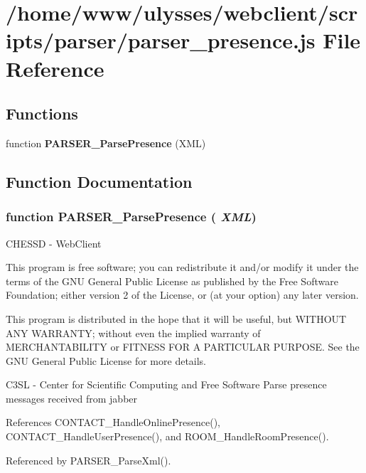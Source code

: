 \section{/home/www/ulysses/webclient/scripts/parser/parser\_\-presence.js File Reference}
\label{parser__presence_8js}
\subsection*{Functions}
\begin{CompactItemize}
\item 
function {\bf PARSER\_\-ParsePresence} (XML)
\end{CompactItemize}


\subsection{Function Documentation}
\subsubsection{\setlength{\rightskip}{0pt plus 5cm}function PARSER\_\-ParsePresence ( {\em XML})}\label{parser__presence_8js_a30203f0ae187eaddbcc60b04bc1a1ff}


CHESSD - WebClient

This program is free software; you can redistribute it and/or modify it under the terms of the GNU General Public License as published by the Free Software Foundation; either version 2 of the License, or (at your option) any later version.

This program is distributed in the hope that it will be useful, but WITHOUT ANY WARRANTY; without even the implied warranty of MERCHANTABILITY or FITNESS FOR A PARTICULAR PURPOSE. See the GNU General Public License for more details.

C3SL - Center for Scientific Computing and Free Software Parse presence messages received from jabber 

References CONTACT\_\-HandleOnlinePresence(), CONTACT\_\-HandleUserPresence(), and ROOM\_\-HandleRoomPresence().

Referenced by PARSER\_\-ParseXml().